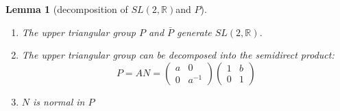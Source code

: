 \documentclass[
  12pt
]{article}
\theoremstyle{break}
\theoremstyle{plain}
\newtheorem{lem}[thm]{Lemma}
\newcommand{\sltr}{\ensuremath{SL(2, \mathbb{R})}}
\begin{document}
  \begin{lem}[decomposition of \sltr and $P$]
    \label{ref:lem:decomp}
    \begin{enumerate}
      \item The upper triangular group $P$ and $\bar{P}$ generate \sltr.
      \item The upper triangular group can be decomposed into the semidirect product:
        $$
        P = AN = \begin{pmatrix}a & 0 \\ 0 & a^{-1}\end{pmatrix} \begin{pmatrix}1 & b \\ 0 & 1\end{pmatrix}
        $$
      \item $N$ is normal in $P$
    \end{enumerate}
     
  \end{lem}
\end{document}
